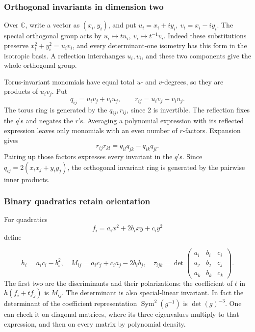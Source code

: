 \documentclass[
]{article}
\begin{document}
\subsubsection{Orthogonal invariants in dimension
two}\label{orthogonal-invariants-in-dimension-two}

Over \(\mathbb C\), write a vector as \((x_i,y_i)\), and put
\(u_i=x_i+iy_i,\ v_i=x_i-iy_i\). The special orthogonal group acts by
\(u_i\mapsto tu_i,\ v_i\mapsto t^{-1}v_i\). Indeed these substitutions
preserve \(x_i^2+y_i^2=u_iv_i\), and every determinant-one isometry has
this form in the isotropic basis. A reflection interchanges \(u_i,v_i\),
and these two components give the whole orthogonal group.

Torus-invariant monomials have equal total \(u\)- and \(v\)-degrees, so
they are products of \(u_iv_j\). Put \[
q_{ij}=u_iv_j+v_iu_j,\qquad r_{ij}=u_iv_j-v_iu_j.
\] The torus ring is generated by the \(q_{ij},r_{ij}\), since \(2\) is
invertible. The reflection fixes the \(q\)'s and negates the \(r\)'s.
Averaging a polynomial expression with its reflected expression leaves
only monomials with an even number of \(r\)-factors. Expansion gives \[
r_{ij}r_{kl}=q_{il}q_{jk}-q_{ik}q_{jl}.
\] Pairing up those factors expresses every invariant in the \(q\)'s.
Since \(q_{ij}=2(x_ix_j+y_iy_j)\), the orthogonal invariant ring is
generated by the pairwise inner products.

\subsubsection{Binary quadratics retain
orientation}\label{binary-quadratics-retain-orientation}

For quadratics \[
f_i=a_ix^2+2b_ixy+c_iy^2
\] define \protect{}\label{equation-P15}{}

\[
h_i=a_ic_i-b_i^2,\quad
M_{ij}=a_ic_j+c_ia_j-2b_ib_j,\quad
\tau_{ijk}=\det\begin{pmatrix}
a_i&b_i&c_i\\a_j&b_j&c_j\\a_k&b_k&c_k
\end{pmatrix}.
\tag{P15}
\] The first two are the discriminants and their polarizations: the
coefficient of \(t\) in \(h(f_i+tf_j)\) is \(M_{ij}\). The determinant
is also special-linear invariant. In fact the determinant of the
coefficient representation \(\operatorname{Sym}^2(g^{-1})\) is
\(\det(g)^{-3}\). One can check it on diagonal matrices, where its three
eigenvalues multiply to that expression, and then on every matrix by
polynomial density.
\end{document}
